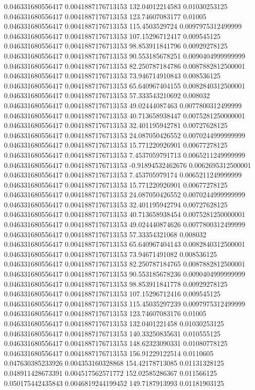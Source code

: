 0.046331680556417 0.0041887176713153 132.04012214583 0.01030253125
0.046331680556417 0.0041887176713153 123.74607083177 0.01005
0.046331680556417 0.0041887176713153 115.4503529724 0.0097975312499999
0.046331680556417 0.0041887176713153 107.15296712417 0.009545125
0.046331680556417 0.0041887176713153 98.853911841796 0.00929278125
0.046331680556417 0.0041887176713153 90.553185678251 0.0090404999999999
0.046331680556417 0.0041887176713153 82.250787184786 0.0087882812500001
0.046331680556417 0.0041887176713153 73.946714910843 0.008536125
0.046331680556417 0.0041887176713153 65.640967404155 0.0082840312500001
0.046331680556417 0.0041887176713153 57.333543210692 0.008032
0.046331680556417 0.0041887176713153 49.02444087463 0.0077800312499999
0.046331680556417 0.0041887176713153 40.713658938447 0.0075281250000001
0.046331680556417 0.0041887176713153 32.401195942781 0.00727628125
0.046331680556417 0.0041887176713153 24.087050426552 0.0070244999999999
0.046331680556417 0.0041887176713153 15.771220926901 0.00677278125
0.046331680556417 0.0041887176713153 7.4537059791713 0.0065211249999999
0.046331680556417 0.0041887176713153 -0.91894532462676 0.0062695312500001
0.046331680556417 0.0041887176713153 7.453705979174 0.0065211249999999
0.046331680556417 0.0041887176713153 15.771220926901 0.00677278125
0.046331680556417 0.0041887176713153 24.087050426552 0.0070244999999999
0.046331680556417 0.0041887176713153 32.401195942794 0.00727628125
0.046331680556417 0.0041887176713153 40.713658938454 0.0075281250000001
0.046331680556417 0.0041887176713153 49.024440874626 0.0077800312499999
0.046331680556417 0.0041887176713153 57.33354321068 0.008032
0.046331680556417 0.0041887176713153 65.640967404143 0.0082840312500001
0.046331680556417 0.0041887176713153 73.94671491082 0.008536125
0.046331680556417 0.0041887176713153 82.250787184765 0.0087882812500001
0.046331680556417 0.0041887176713153 90.553185678236 0.0090404999999999
0.046331680556417 0.0041887176713153 98.853911841778 0.00929278125
0.046331680556417 0.0041887176713153 107.15296712416 0.009545125
0.046331680556417 0.0041887176713153 115.45035297239 0.0097975312499999
0.046331680556417 0.0041887176713153 123.74607083176 0.01005
0.046331680556417 0.0041887176713153 132.0401221458 0.01030253125
0.046331680556417 0.0041887176713153 140.33250835631 0.010555125
0.046331680556417 0.0041887176713153 148.62323090331 0.01080778125
0.046331680556417 0.0041887176713153 156.91229122514 0.0110605
0.047630385233926 0.004353160328868 154.42178713085 0.01131328125
0.048911428673391 0.004517562571772 152.02585286367 0.011566125
0.050175442435843 0.0046819244199452 149.7187913993 0.01181903125
